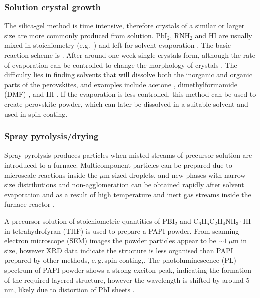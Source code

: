 \subsubsection{Solution crystal growth}
\label{sec:solutiongrowth}
The silica-gel method is time intensive, therefore crystals of a similar or larger size are more commonly produced from solution. Pb$\textrm{I}_2$, R$\textrm{NH}_2$ and HI are usually mixed in stoichiometry (e.g.\ \cite{Kitazawa1996, Tang2001}) and left for solvent evaporation \cite{Ishihara1994}. The basic reaction scheme is . After around one week single crystals form, although the rate of evaporation can be controlled to change the morphology of crystals \cite{Cheng2010}. The difficulty lies in finding solvents that will dissolve both the inorganic and organic parts of the perovskites, and examples include acetone \cite{Hong1992}, dimethylformamide (DMF) \cite{Kitazawa1996}, and HI \cite{Barman2003}. If the evaporation is less controlled, this method can be used to create perovskite powder, which can later be dissolved in a suitable solvent and used in spin coating.

\subsubsection {Spray pyrolysis/drying}
Spray pyrolysis produces particles when misted streams of precursor solution are introduced to a furnace. Multicomponent particles can be prepared due to microscale reactions inside the $\mu$m-sized droplets, and new phases with narrow size distributions and non-agglomeration can be obtained rapidly after solvent evaporation and as a result of high temperature and inert gas streams inside the furnace reactor \cite{Cheng2005}. 

A precursor solution of stoichiometric quantities of $\textrm{PBI}_2$ and $\textrm{C}_6\textrm{H}_5\textrm{C}_2\textrm{H}_4\textrm{NH}_3\cdot\textrm{HI}$ in tetrahydrofyran (THF) is used to prepare a PAPI powder. From scanning electron microscope (SEM) images the powder particles appear to be $\sim 1\, \mu$m in size, however XRD data indicate the structure is less organised than PAPI prepared by other methods, e.\,g.\,spin coating,. The photoluminescence (PL) spectrum of PAPI powder shows a strong exciton peak, indicating the formation of the required layered structure, however the wavelength is shifted by around 5\,nm, likely due to distortion of PbI sheets \cite{Cheng2005}.

